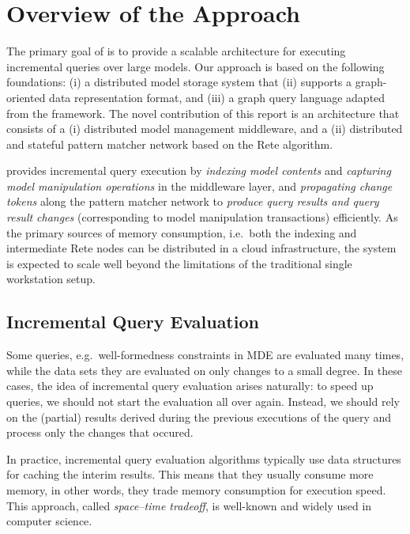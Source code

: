 \chapter{Overview of the Approach}
\label{chap:overview}

The primary goal of \iqd{} is to provide a scalable architecture for executing incremental queries over large models. Our approach is based on the following foundations: (i) a distributed model storage system that (ii) supports a graph-oriented data representation format, and (iii) a graph query language adapted from the \eiq{} framework. The novel contribution of this report is an architecture that consists of a (i) distributed model management middleware, and a (ii) distributed and stateful pattern matcher network based on the Rete algorithm.

\iqd{} provides incremental query execution by \emph{indexing model contents} and \emph{capturing model manipulation operations} in the middleware layer, and \emph{propagating change tokens} along the pattern matcher network to \emph{produce query results and query result changes} (corresponding to model manipulation transactions) efficiently. As the primary sources of memory consumption, i.e.\ both the indexing and intermediate Rete nodes can be distributed in a cloud infrastructure, the system is expected to scale well beyond the limitations of the traditional single workstation setup.


\section{Incremental Query Evaluation}
\label{rete}

Some queries, e.g.\ well-formedness constraints in MDE are evaluated many times, while the data sets they are evaluated on only changes to a small degree. In these cases, the idea of incremental query evaluation arises naturally: to speed up queries, we should not start the evaluation all over again. Instead, we should rely on the (partial) results derived during the previous executions of the query and process only the changes that occured.
 
In practice, incremental query evaluation algorithms typically use data structures for caching the interim results. This  means that they usually consume more memory, in other words, they trade memory consumption for execution speed. This approach, called \emph{space--time tradeoff}, is well-known and widely used in computer science.

